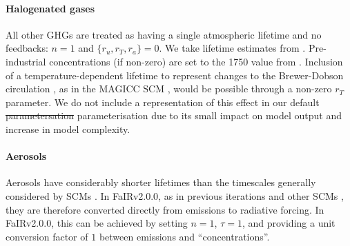 \documentclass[gmd, manuscript]{copernicus}
\providecommand{\DIFadd}[1]{{\protect\color{blue}#1}} %
\providecommand{\DIFdel}[1]{{\protect\color{red}\sout{#1}}}                      %
\providecommand{\DIFaddbegin}{} %
\providecommand{\DIFaddend}{} %
\providecommand{\DIFdelbegin}{} %
\providecommand{\DIFdelend}{} %
\begin{document}
\paragraph*{Halogenated gases}
All other GHGs are treated as having a single atmospheric lifetime and no feedbacks: $n=1$ and $\{r_u,r_T,r_a\}=0$. We take lifetime estimates from \cite{WMOAppA}. Pre-industrial concentrations (if non-zero) are set to the 1750 value from \cite{Meinshausen2017}. Inclusion of a temperature-dependent lifetime to represent changes to the Brewer-Dobson circulation \citep{Butchart2001}, as in the MAGICC SCM \citep{Meinshausen2011}, would be possible through a non-zero $r_T$ parameter. We do not include a representation of this effect in our default \DIFdelbegin \DIFdel{parametersation }\DIFdelend \DIFaddbegin \DIFadd{parameterisation }\DIFaddend due to its small impact on model output and increase in model complexity.
\paragraph*{Aerosols}
Aerosols have considerably shorter lifetimes than the timescales generally considered by SCMs \citep{Kristiansen2016}. In FaIRv2.0\DIFaddbegin \DIFadd{.0}\DIFaddend , as in previous iterations \citep{Smith2018} and other SCMs \citep{Meinshausen2011}, they are therefore converted directly from emissions to radiative forcing. In FaIRv2.0\DIFaddbegin \DIFadd{.0}\DIFaddend , this can be achieved by setting $n=1$, $\tau=1$, and providing a unit conversion factor of $1$ between emissions and ``concentrations''.
\end{document}

